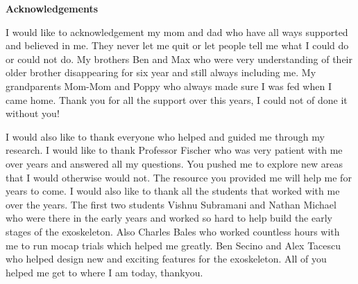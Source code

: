 \begin{center}
	\textbf{Acknowledgements}
	 
\end{center}

I would like to acknowledgement my mom and dad who have all ways supported and believed in me. They never let me quit or let people tell me what I could do or could not do. My brothers Ben and Max who were very understanding of their older brother disappearing for six year and still always including me. My grandparents Mom-Mom and Poppy who always made sure I was fed when I came home. Thank you for all the support over this years, I could not of done it without you!

I would also like to thank everyone who helped and guided me through my research. I would like to thank Professor Fischer who was very patient with me over years and answered all my questions. You pushed me to explore new areas that I would otherwise would not. The resource you provided me will help me for years to come. I would also like to thank all the students that worked with me over the years. The first two students Vishnu Subramani and Nathan Michael who were there in the early years and worked so hard to help build the early stages of the exoskeleton. Also Charles Bales who worked countless hours with me to run mocap trials which helped me greatly. Ben Secino and Alex Tacescu who helped design new and exciting features for the exoskeleton. All of you helped me get to where I am today, thankyou.  

\clearpage